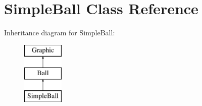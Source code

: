 \hypertarget{class_simple_ball}{}\section{Simple\+Ball Class Reference}
\label{class_simple_ball}
Inheritance diagram for Simple\+Ball\+:\begin{figure}[H]
\begin{center}
\leavevmode
\includegraphics[height=3.000000cm]{class_simple_ball}
\end{center}
\end{figure}
